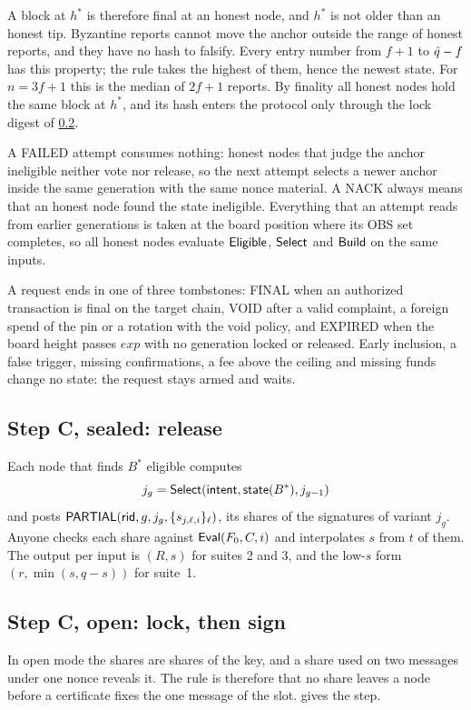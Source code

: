 A block at $h^*$ is therefore final at an honest node, and $h^*$ is not older than an honest tip. Byzantine reports cannot move the anchor outside the range of honest reports, and they have no hash to falsify. Every entry number from $f+1$ to $\hat{q} - f$ has this property; the rule takes the highest of them, hence the newest state. For $n = 3f+1$ this is the median of $2f+1$ reports. By finality all honest nodes hold the same block at $h^*$, and its hash enters the protocol only through the lock digest of \cref{sec:open}.

A \textsf{FAILED} attempt consumes nothing: honest nodes that judge the anchor ineligible neither vote nor release, so the next attempt selects a newer anchor inside the same generation with the same nonce material. A NACK always means that an honest node found the state ineligible. Everything that an attempt reads from earlier generations is taken at the board position where its OBS set completes, so all honest nodes evaluate $\mathsf{Eligible}$, $\mathsf{Select}$ and $\mathsf{Build}$ on the same inputs.

A request ends in one of three tombstones: \textsf{FINAL} when an authorized transaction is final on the target chain, \textsf{VOID} after a valid complaint, a foreign spend of the pin or a rotation with the void policy, and \textsf{EXPIRED} when the board height passes $exp$ with no generation locked or released. Early inclusion, a false trigger, missing confirmations, a fee above the ceiling and missing funds change no state: the request stays armed and waits.

\subsection{Step C, sealed: release}\label{sec:sealed}

Each node that finds $B^*$ eligible computes
\[
  j_g = \mathsf{Select}(\textsf{intent}, \mathsf{state}(B^*), j_{g-1})
\]
and posts $\textsf{PARTIAL}(\mathsf{rid}, g, j_g, \{s_{j,\ell,i}\}_\ell)$, its shares of the signatures of variant $j_g$. Anyone checks each share against $\mathsf{Eval}(F_0, C, i)$ and interpolates $s$ from $t$ of them. The output per input is $(R,s)$ for suites 2 and 3, and the low-$s$ form $(r, \min(s, q-s))$ for suite~1.

\subsection{Step C, open: lock, then sign}\label{sec:open}

In open mode the shares are shares of the key, and a share used on two messages under one nonce reveals it. The rule is therefore that no share leaves a node before a certificate fixes the one message of the slot.  gives the step.

